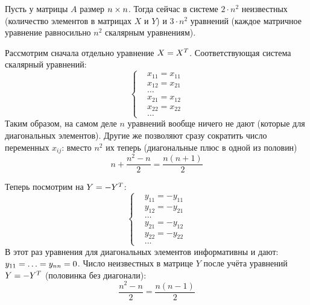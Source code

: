 \documentclass[a4paper,12pt]{article}
\begin{document}
\begin{solution}
    Пусть у матрицы $A$ размер $n \hm\times n$.
    Тогда сейчас в системе $2 \cdot n^2$ неизвестных (количество элементов в матрицах $X$ и $Y$) и $3 \cdot n^2$ уравнений (каждое матричное уравнение равносильно $n^2$ скалярным уравнениям).
    
    Рассмотрим сначала отдельно уравнение $X \hm= X^T$.
    Соответствующая система скалярный уравнений:
    \[
      \left\{
        \begin{aligned}
          &x_{11} = x_{11}\\
          &x_{12} = x_{21}\\
          &\ldots\\
          &x_{21} = x_{12}\\
          &x_{22} = x_{22}\\
          &\ldots
        \end{aligned}
      \right.
    \]
    Таким образом, на самом деле $n$ уравнений вообще ничего не дают (которые для диагональных элементов).
    Другие же позволяют сразу сократить число переменных $x_{ij}$: вместо $n^2$ их теперь (диагональные плюс в одной из половин)
    \[
      n + \frac{n^2 - n}{2} = \frac{n (n + 1)}{2}
    \]
    
    Теперь посмотрим на $Y \hm= -Y^T$:
    \[
      \left\{
        \begin{aligned}
          &y_{11} = -y_{11}\\
          &y_{12} = -y_{21}\\
          &\ldots\\
          &y_{21} = -y_{12}\\
          &y_{22} = -y_{22}\\
          &\ldots
        \end{aligned}
      \right.
    \]
    В этот раз уравнения для диагональных элементов информативны и дают: $y_{11} \hm= \ldots \hm= y_{nn} \hm= 0$.
    Число неизвестных в матрице $Y$ после учёта уравнений $Y \hm= -Y^T$ (половинка без диагонали):
    \[
      \frac{n^2 - n}{2} = \frac{n (n - 1)}{2}
    \]
    

\end{solution}
\end{document}
